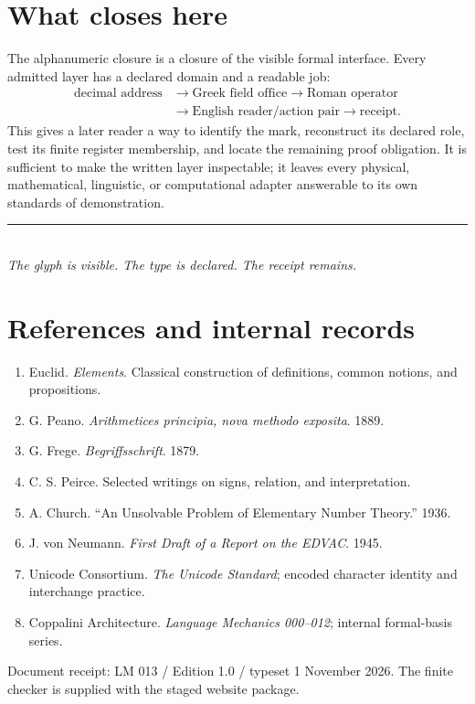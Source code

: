 \documentclass[11pt]{article}
\begin{document}
\section{What closes here}
The alphanumeric closure is a closure of the visible formal interface. Every admitted layer has a declared domain and a readable job:
\begin{equation}
\begin{aligned}
\text{decimal address}&\longrightarrow\text{Greek field office}\longrightarrow\text{Roman operator}\\
&\longrightarrow\text{English reader/action pair}\longrightarrow\text{receipt}.
\end{aligned}
\end{equation}
This gives a later reader a way to identify the mark, reconstruct its declared role, test its finite register membership, and locate the remaining proof obligation. It is sufficient to make the written layer inspectable; it leaves every physical, mathematical, linguistic, or computational adapter answerable to its own standards of demonstration.

\vfill
\begin{center}
\rule{.75\textwidth}{0.45pt}\\[1em]
\textit{The glyph is visible. The type is declared. The receipt remains.}
\end{center}

\newpage
\section*{References and internal records}
\begin{enumerate}[leftmargin=1.8em,itemsep=.55em]
\item Euclid. \textit{Elements}. Classical construction of definitions, common notions, and propositions.
\item G. Peano. \textit{Arithmetices principia, nova methodo exposita}. 1889.
\item G. Frege. \textit{Begriffsschrift}. 1879.
\item C. S. Peirce. Selected writings on signs, relation, and interpretation.
\item A. Church. ``An Unsolvable Problem of Elementary Number Theory.'' 1936.
\item J. von Neumann. \textit{First Draft of a Report on the EDVAC}. 1945.
\item Unicode Consortium. \textit{The Unicode Standard}; encoded character identity and interchange practice.
\item Coppalini Architecture. \textit{Language Mechanics 000--012}; internal formal-basis series.
\end{enumerate}

\vspace{1em}
{\small\color{muted}Document receipt: LM 013 / Edition 1.0 / typeset 1 November 2026. The finite checker is supplied with the staged website package.}
\end{document}
